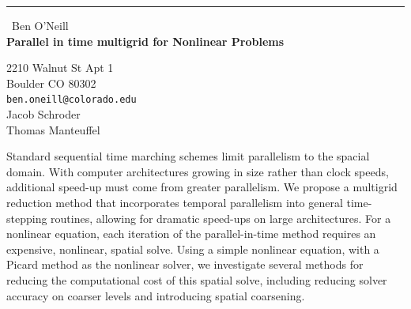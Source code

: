 \documentclass{report}
\begin{document}
\begin{center}
\rule{6in}{1pt} \
{\large Ben O'Neill \\
{\bf Parallel in time multigrid for Nonlinear Problems}}

2210 Walnut St Apt 1 \\ Boulder CO 80302
\\
{\tt ben.oneill@colorado.edu}\\
Jacob Schroder\\
Thomas Manteuffel\end{center}

Standard sequential time marching schemes limit parallelism to the
spacial domain. With computer architectures growing in size rather than
clock speeds, additional speed-up must come from greater parallelism. We
propose a multigrid reduction method that incorporates temporal
parallelism into general time-stepping routines, allowing for dramatic
speed-ups on large architectures. For a nonlinear equation, each
iteration of the parallel-in-time method requires an expensive,
nonlinear, spatial solve. Using a simple nonlinear equation, with a
Picard method as the nonlinear solver, we investigate several methods for
reducing the computational cost of this spatial solve, including reducing
solver accuracy on coarser levels and introducing spatial coarsening.
\end{document}
